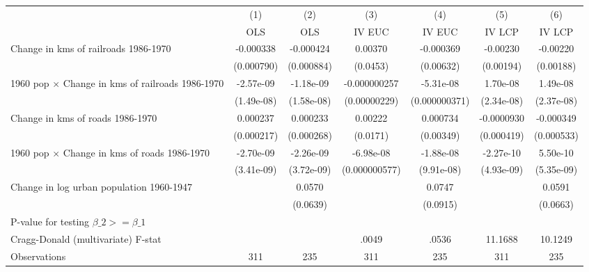 {
\def\sym#1{\ifmmode^{#1}\else\(^{#1}\)\fi}
\begin{tabular}{l*{6}{c}}
\hline\hline
                &\multicolumn{1}{c}{(1)}&\multicolumn{1}{c}{(2)}&\multicolumn{1}{c}{(3)}&\multicolumn{1}{c}{(4)}&\multicolumn{1}{c}{(5)}&\multicolumn{1}{c}{(6)}\\
                &\multicolumn{1}{c}{OLS}&\multicolumn{1}{c}{OLS}&\multicolumn{1}{c}{IV EUC}&\multicolumn{1}{c}{IV EUC}&\multicolumn{1}{c}{IV LCP}&\multicolumn{1}{c}{IV LCP}\\
\hline
Change in kms of railroads 1986-1970&-0.000338         &-0.000424         &  0.00370         &-0.000369         & -0.00230         & -0.00220         \\
                &(0.000790)         &(0.000884)         & (0.0453)         &(0.00632)         &(0.00194)         &(0.00188)         \\
[1em]
1960 pop $\times$ Change in kms of railroads 1986-1970&-2.57e-09         &-1.18e-09         &-0.000000257         &-5.31e-08         & 1.70e-08         & 1.49e-08         \\
                &(1.49e-08)         &(1.58e-08)         &(0.00000229)         &(0.000000371)         &(2.34e-08)         &(2.37e-08)         \\
[1em]
Change in kms of roads 1986-1970& 0.000237         & 0.000233         &  0.00222         & 0.000734         &-0.0000930         &-0.000349         \\
                &(0.000217)         &(0.000268)         & (0.0171)         &(0.00349)         &(0.000419)         &(0.000533)         \\
[1em]
1960 pop $\times$ Change in kms of roads 1986-1970&-2.70e-09         &-2.26e-09         &-6.98e-08         &-1.88e-08         &-2.27e-10         & 5.50e-10         \\
                &(3.41e-09)         &(3.72e-09)         &(0.000000577)         &(9.91e-08)         &(4.93e-09)         &(5.35e-09)         \\
[1em]
Change in log urban population 1960-1947&                  &   0.0570         &                  &   0.0747         &                  &   0.0591         \\
                &                  & (0.0639)         &                  & (0.0915)         &                  & (0.0663)         \\
\hline
P-value for testing $\beta\_{2} >= \beta\_{1}$&                  &                  &                  &                  &                  &                  \\
Cragg-Donald (multivariate) F-stat&                  &                  &    .0049         &    .0536         &  11.1688         &  10.1249         \\
Observations    &      311         &      235         &      311         &      235         &      311         &      235         \\
\hline\hline
\end{tabular}
}
